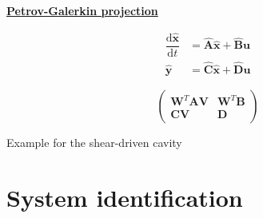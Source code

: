 \documentclass[aspectratio=169, usenames, dvipsnames]{beamer}
\begin{document}
\begin{frame}
  \vfill

  \centering
  \underline{\textbf{Petrov-Galerkin projection}}

  \bigskip

  \begin{overprint}
    \Large
    \[
    \begin{aligned}
      \dfrac{\mathrm{d} \hat{\bm{x}}}{\mathrm{d}t} & = \hat{\bm{A}} \hat{\bm{x}} + \hat{\bm{B}} \bm{u} \\
      \hat{\bm{y}} & = \hat{\bm{C}} \hat{\bm{x}} + \hat{\bm{D}} \bm{u}
    \end{aligned}
    \]

    \Large
    \[\left(
    \begin{array}{c|c}
      \bm{W}^T \bm{A} \bm{V} & \bm{W}^T \bm{B} \\
      \hline
      \bm{C} \bm{V} & \bm{D}
    \end{array}
    \right)
    \]

  \end{overprint}

  \vfill
\end{frame}

\begin{frame}
  Example for the shear-driven cavity
\end{frame}










\section{System identification}
\begin{frame}
  \sectionpage
\end{frame}

\begin{frame}
  \vfill

  \vfill
\end{frame}
\end{document}
